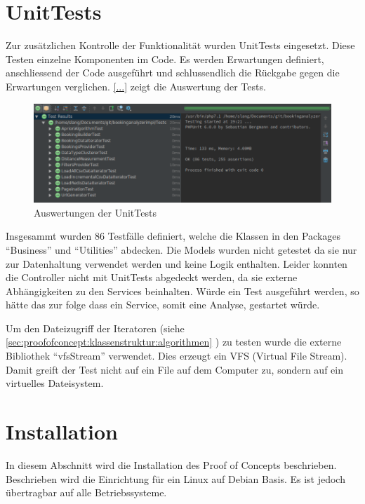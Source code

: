 \section{UnitTests}
\label{sec:proofofconcept:unittests}
Zur zusätzlichen Kontrolle der Funktionalität wurden UnitTests eingesetzt. Diese Testen einzelne Komponenten im Code. Es werden Erwartungen definiert, anschliessend der Code ausgeführt und schlussendlich die Rückgabe gegen die Erwartungen verglichen. \cref{...} zeigt die Auswertung der Tests.

\begin{figure}[H]
	\RawFloats
	\centering
	\includegraphics[width=1\textwidth]{images/unittests}
	\caption{Auswertungen der UnitTests}
	\label{fig:proofofconcept:unittests:1}
\end{figure}

Insgesammt wurden 86 Testfälle definiert, welche die Klassen in den Packages "`Business"' und "`Utilities"' abdecken. Die Models wurden nicht getestet da sie nur zur Datenhaltung verwendet werden und keine Logik enthalten. Leider konnten die Controller nicht mit UnitTests abgedeckt werden, da sie externe Abhängigkeiten zu den Services beinhalten. Würde ein Test ausgeführt werden, so hätte das zur folge dass ein Service, somit eine Analyse, gestartet würde.

Um den Dateizugriff der Iteratoren (siehe \cref{sec:proofofconcept:klassenstruktur:algorithmen} ) zu testen wurde die externe Bibliothek "`vfsStream"' verwendet. Dies erzeugt ein VFS (Virtual File Stream). Damit greift der Test nicht auf ein File auf dem Computer zu, sondern auf ein virtuelles Dateisystem.

\section{Installation}
In diesem Abschnitt wird die Installation des Proof of Concepts beschrieben. Beschrieben wird die Einrichtung für ein Linux auf Debian Basis. Es ist jedoch übertragbar auf alle Betriebssysteme.


